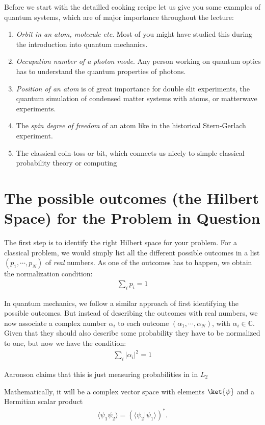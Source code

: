Before we start with the detailled cooking recipe let us give you some examples of  quantum systems, which are of major importance throughout the lecture:
\begin{enumerate}
\item \textit{Orbit in an atom, molecule etc}. Most of you might have studied this during the introduction into quantum mechanics.
\item \textit{Occupation number of a photon mode}. Any person working on quantum optics has to understand the quantum properties of photons.
\item \textit{Position of an atom} is of great importance for double slit experiments, the quantum simulation of condensed matter systems with atoms,  or matterwave experiments.
\item The \textit{spin degree of freedom} of an atom like in the historical Stern-Gerlach experiment. 
\item The classical coin-toss or bit, which connects us nicely to simple classical probability theory or computing
\end{enumerate}

\section{The possible outcomes  (the Hilbert Space) for the Problem in Question}

The first step is to identify the right Hilbert space for your problem. For a classical problem, we would simply list all the different possible outcomes in a list $(p_1, \cdots, p_N)$ of \textit{real} numbers. As one of the outcomes has to happen, we obtain the normalization condition:
\begin{align}
\sum_i p_i = 1
\end{align}

In quantum mechanics, we follow a similar approach of first identifying the possible outcomes. But instead of describing the outcomes with real numbers, we now associate a complex number $\alpha_i$ to each outcome $(\alpha_1, \cdots, \alpha_N)$, with $\alpha_i \in \mathbb{C}$. Given that they should also describe some probability they have to be normalized to one, but now we have the condition:
\begin{align}
\sum_i |\alpha_i|^2 = 1
\end{align}

Aaronson claims that this is just measuring probabilities in in $L_2$

Mathematically, it will be a complex vector space with elements $\ket{\psi}$ and a Hermitian scalar product
\begin{align}
				\langle\psi_1 \psi_2\rangle=(\langle{\psi_2}| \psi_1\rangle)^*.
\end{align}

